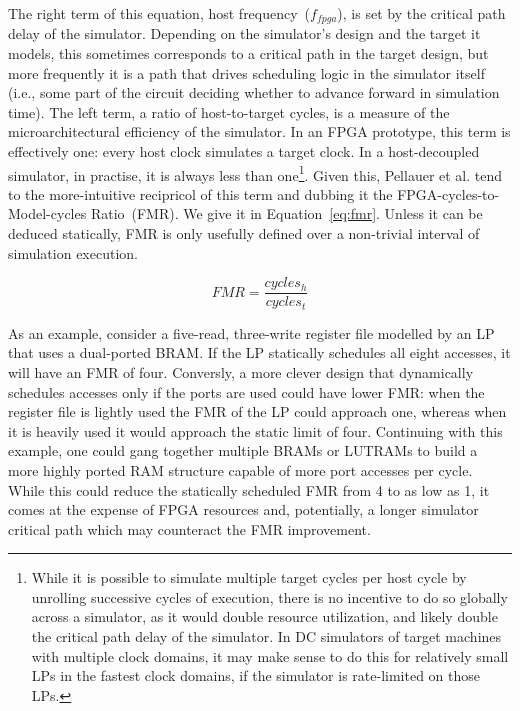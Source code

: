 The right term of this equation, host frequency~($f_{fpga}$), is set by the
critical path delay of the simulator. Depending on the simulator's design and
the target it models, this sometimes corresponds to a critical path in the target design, but more frequently it is a path that
drives scheduling logic in the simulator itself (i.e., some part of the circuit deciding whether to
advance forward in simulation time). The left term, a ratio of host-to-target cycles, is a measure of the
microarchitectural efficiency of the simulator. In an FPGA prototype, this term is
effectively one: every host clock simulates a target clock. In
a host-decoupled simulator, in practise, it is always less than one\footnote{While it is possible to simulate multiple target cycles per
host cycle by unrolling successive cycles of execution, there is no incentive
to do so globally across a simulator, as it would double resource utilization,
and likely double the critical path delay of the simulator. In DC simulators
of target machines with multiple clock domains, it may make sense to do this
for relatively small LPs in the fastest clock domains, if the simulator is
rate-limited on those LPs.}. Given this, Pellauer et al. tend to the
more-intuitive recipricol of this term and dubbing it the FPGA-cycles-to-Model-cycles
Ratio~(FMR). We give it in Equation~\ref{eq:fmr}. Unless it can be deduced statically,
FMR is only usefully defined over a non-trivial interval of simulation execution.

\begin{equation}
    FMR = \frac{cycles_{h}}{cycles_{t}}
\end{equation}\label{eq:fmr}

As an example, consider a five-read, three-write register file modelled by an LP that
uses a dual-ported BRAM. If the LP statically schedules all eight accesses, it
will have an FMR of four. Conversly, a more clever design that dynamically
schedules accesses only if the ports are used could have lower FMR: when the register file is lightly used the FMR of the LP could
approach one, whereas when it is heavily used it would approach the static
limit of four. Continuing with
this example, one could gang together multiple BRAMs or LUTRAMs to build a more
highly ported RAM structure capable of more port accesses per cycle.
While this could reduce the statically scheduled FMR from 4 to as low as 1, it
comes at the expense of FPGA resources and, potentially, a longer simulator
critical path which may counteract the FMR improvement.

